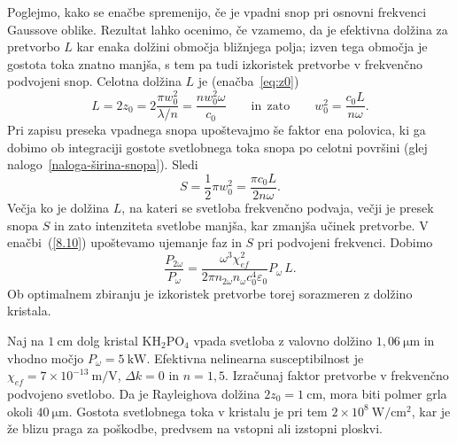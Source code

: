 Poglejmo, kako se enačbe spremenijo, če je vpadni snop pri osnovni 
frekvenci Gaussove oblike. 
Rezultat lahko ocenimo, če vzamemo, da je
efektivna dolžina za pretvorbo $L$ kar enaka dolžini območja bližnjega polja; izven tega območja je 
gostota toka znatno manjša, s tem pa tudi izkoristek pretvorbe v 
frekvenčno podvojeni snop.
Celotna  dolžina $L$ je (enačba~\ref{eq:z0})
\begin{equation}
L=2z_{0}=2\frac{\pi w_{0}^{2}}{\lambda/n} = \frac{n w_0^2 \omega}{c_0}  \qquad \mathrm{in~~zato} \qquad 
w_{0}^{2} = \frac{c_0 L}{n \omega}.
\label{SHGG}
\end{equation}
Pri zapisu preseka vpadnega snopa upoštevajmo še faktor ena polovica, ki ga dobimo ob integraciji
 gostote svetlobnega toka
snopa po celotni površini (glej nalogo~\ref{naloga-širina-snopa}). Sledi
\begin{equation}
S=\frac{1}{2}\pi w_{0}^{2} = \frac{\pi c_0 L}{2 n \omega}.
\end{equation}
Večja ko je dolžina $L$, na kateri se svetloba frekvenčno podvaja, 
večji je presek snopa $S$ in zato intenziteta svetlobe manjša, kar zmanjša
učinek pretvorbe.
V enačbi~(\ref{8.10}) upoštevamo ujemanje faz in $S$ pri podvojeni frekvenci. Dobimo
\begin{equation}
\frac{P_{2\omega}}{P_{\omega}}=
\frac{\omega^3 \chi_{ef}^2}{2\pi n_{2\omega} n_\omega c_0^4\varepsilon_0} P_\omega\, L.
\label{8.17}
\end{equation}
Ob optimalnem zbiranju je izkoristek pretvorbe torej sorazmeren z dolžino kristala.
\begin{definition}
Naj na $1~\si{\centi\metre}$ dolg kristal KH$_{2}$PO$_{4}$ vpada svetloba
z valovno dolžino $1,06~\si{\micro\metre}$ in vhodno močjo $P_\omega = 5~\si{\kilo\watt}$.
Efektivna nelinearna susceptibilnost je $\chi_{ef}=7\times 10^{-13}~\si{\metre/\volt}$, 
$\Delta k=0$ in $n=1,5$. Izračunaj
faktor pretvorbe v frekvenčno podvojeno svetlobo.
Da je Rayleighova dolžina $2z_{0}=1~\si{\centi\metre}$, mora biti polmer
grla okoli $40~\si{\micro\metre}$. Gostota svetlobnega toka v kristalu je pri
tem $2\times 10^{8}~\si{\watt/\centi\metre^{2}}$, kar je že blizu praga za poškodbe,
predvsem na vstopni ali izstopni ploskvi. 
\end{definition}


